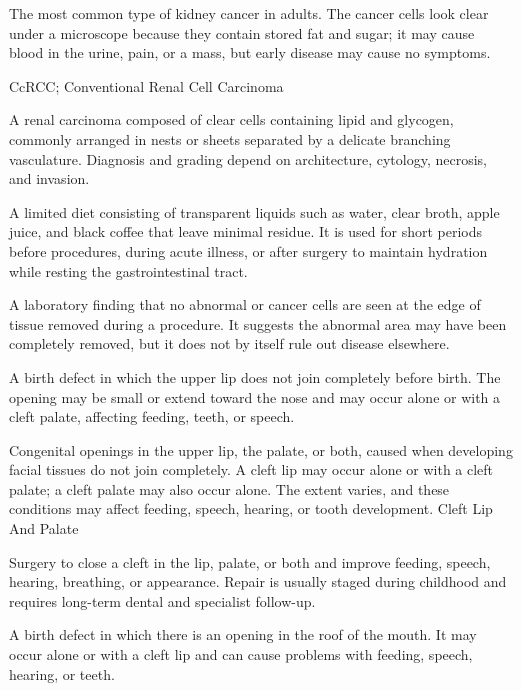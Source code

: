 The most common type of kidney cancer in adults. The cancer cells look clear under a microscope because they contain stored fat and sugar; it may cause blood in the urine, pain, or a mass, but early disease may cause no symptoms.

\synonyms
CcRCC; Conventional Renal Cell Carcinoma

 A renal carcinoma composed of clear cells containing lipid and glycogen, commonly arranged in nests or sheets separated by a delicate branching vasculature. Diagnosis and grading depend on architecture, cytology, necrosis, and invasion.

 A limited diet consisting of transparent liquids such as water, clear broth, apple juice, and black coffee that leave minimal residue. It is used for short periods before procedures, during acute illness, or after surgery to maintain hydration while resting the gastrointestinal tract.

 A laboratory finding that no abnormal or cancer cells are seen at the edge of tissue removed during a procedure. It suggests the abnormal area may have been completely removed, but it does not by itself rule out disease elsewhere.

 A birth defect in which the upper lip does not join completely before birth. The opening may be small or extend toward the nose and may occur alone or with a cleft palate, affecting feeding, teeth, or speech.

 Congenital openings in the upper lip, the palate,
or both, caused when developing facial tissues do not join completely. A cleft lip may
occur alone or with a cleft palate; a cleft palate may also occur alone. The extent
varies, and these conditions may affect feeding, speech, hearing, or tooth development.
\synonyms
Cleft Lip And Palate

 Surgery to close a cleft in the lip, palate, or both and improve feeding, speech, hearing, breathing, or appearance. Repair is usually staged during childhood and requires long-term dental and specialist follow-up.

 A birth defect in which there is an opening in the roof of the
mouth. It may occur alone or with a cleft lip and can cause problems with feeding,
speech, hearing, or teeth.

